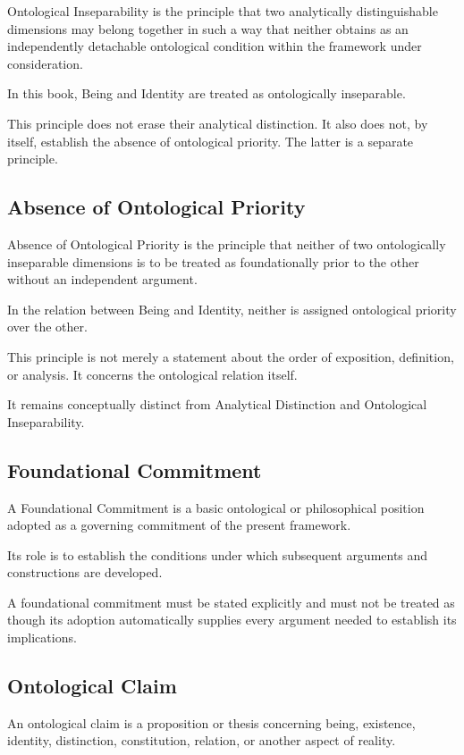 Ontological Inseparability is the principle that two analytically
distinguishable dimensions may belong together in such a way that
neither obtains as an independently detachable ontological condition
within the framework under consideration.

In this book, Being and Identity are treated as ontologically inseparable.

This principle does not erase their analytical distinction. It also
does not, by itself, establish the absence of ontological priority.
The latter is a separate principle.


\subsection*{Absence of Ontological Priority}

Absence of Ontological Priority is the principle that neither of two
ontologically inseparable dimensions is to be treated as foundationally
prior to the other without an independent argument.

In the relation between Being and Identity, neither is assigned
ontological priority over the other.

This principle is not merely a statement about the order of exposition,
definition, or analysis. It concerns the ontological relation itself.

It remains conceptually distinct from Analytical Distinction and
Ontological Inseparability.


\subsection*{Foundational Commitment}

A Foundational Commitment is a basic ontological or philosophical
position adopted as a governing commitment of the present framework.

Its role is to establish the conditions under which subsequent
arguments and constructions are developed.

A foundational commitment must be stated explicitly and must not
be treated as though its adoption automatically supplies every
argument needed to establish its implications.


\subsection*{Ontological Claim}

An ontological claim is a proposition or thesis concerning being,
existence, identity, distinction, constitution, relation, or another
aspect of reality.


